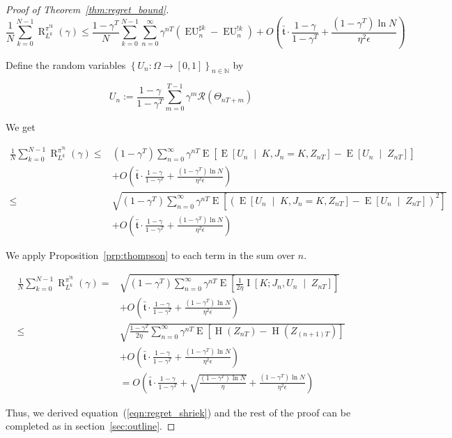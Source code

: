 \documentclass[anon,12pt]{colt2018} %
\newcommand{\Comment}[1]{}
\newcommand{\AP}[1]{\left(#1\right)}
\newcommand{\AB}[1]{\left[#1\right]}
\newcommand{\AC}[1]{\left\{#1\right\}}
\newcommand{\ABM}[2]{\left[#1\;\middle\vert\;#2\right]}
\newcommand{\Ea}[2]{\underset{#1}{\operatorname{E}}\AB{#2}}
\newcommand{\CE}[3]{\underset{#1}{\operatorname{E}}\ABM{#2}{#3}}
\newcommand{\CI}[3]{\underset{#1}{\operatorname{I}}\ABM{#2}{#3}}
\newcommand{\Ena}[1]{\operatorname{H}\AP{#1}}
\newcommand{\Nats}{\mathbb{N}}
\newcommand{\R}{\mathcal{R}}
\newcommand{\EU}{\operatorname{EU}}
\newcommand{\Rg}{\operatorname{R}}
\newcommand{\Tn}{\mathfrak{t}}
\newcommand{\IP}{\pi^{!k}}
\begin{document}
\begin{proof}[Proof of Theorem~\ref{thm:regret_bound}]
\[\frac{1}{N}\sum_{k=0}^{N-1}\Rg_{L^k}^{\IP}(\gamma) \leq \frac{1-\gamma^T}{N}\sum_{k=0}^{N-1}\sum_{n=0}^\infty \gamma^{nT}\AP{\EU^{\sharp k}_n-\EU^{!k}_n}+O\AP{\bar{\Tn}\cdot\frac{1-\gamma}{1-\gamma^T}+\frac{\AP{1-\gamma^T}\ln{N}}{\eta^2\epsilon}}\]

Define the random variables $\AC{U_n : \Omega \rightarrow [0,1]}_{n\in\Nats}$ by 

$$U_n:=\frac{1-\gamma}{1-\gamma^T}\sum_{m=0}^{T-1} \gamma^{m} \R\AP{\Theta_{nT+m}}$$

\Comment{Denote 

$$\beta:=\frac{\AP{1-(1-\alpha)^T}\ln N}{\eta^2\epsilon}+\frac{\bar{\tau}\alpha}{1-(1-\alpha)^T}$$}

We get

\begin{align*}
\frac{1}{N}\sum_{k=0}^{N-1}\Rg_{L^k}^{\IP}(\gamma) \leq &\AP{1-\gamma^T}\sum_{n=0}^\infty \gamma^{nT} \Ea{}{\CE{}{U_n}{K, J_n = K, Z_{nT}}-\CE{}{U_n}{Z_{nT}}} \\ 
&+ O\AP{\bar{\Tn}\cdot\frac{1-\gamma}{1-\gamma^T}+\frac{\AP{1-\gamma^T}\ln{N}}{\eta^2\epsilon}}\\
\leq &\sqrt{\AP{1-\gamma^T}\sum_{n=0}^\infty \gamma^{nT} \Ea{}{\AP{\CE{}{U_n}{K, J_n = K, Z_{nT}}-\CE{}{U_n}{Z_{nT}}}^2}} \\ 
&+ O\AP{\bar{\Tn}\cdot\frac{1-\gamma}{1-\gamma^T}+\frac{\AP{1-\gamma^T}\ln{N}}{\eta^2\epsilon}}
\end{align*}

We apply Proposition~\ref{prp:thompson} to each term in the sum over $n$.

\begin{align*}
\frac{1}{N}\sum_{k=0}^{N-1}\Rg_{L^k}^{\IP}(\gamma) = &\sqrt{\AP{1-\gamma^T}\sum_{n=0}^\infty \gamma^{nT} \Ea{}{\frac{1}{2\eta}\CI{}{K;J_n,U_n}{Z_{nT}}}} \\
&+ O\AP{\bar{\Tn}\cdot\frac{1-\gamma}{1-\gamma^T}+\frac{\AP{1-\gamma^T}\ln{N}}{\eta^2\epsilon}}\\
\leq &\sqrt{\frac{1-\gamma^T}{2\eta}\sum_{n=0}^\infty \gamma^{nT} \Ea{}{\Ena{Z_{nT}}-\Ena{Z_{(n+1)T}}}} \\
&+ O\AP{\bar{\Tn}\cdot\frac{1-\gamma}{1-\gamma^T}+\frac{\AP{1-\gamma^T}\ln{N}}{\eta^2\epsilon}}\\
&=O\AP{\bar{\Tn}\cdot\frac{1-\gamma}{1-\gamma^T}+\sqrt{\frac{\AP{1-\gamma^T}\ln{N}}{\eta}}+\frac{\AP{1-\gamma^T}\ln{N}}{\eta^2\epsilon}}
\end{align*}

Thus, we derived equation~(\ref{eqn:regret_shriek}) and the rest of the proof can be completed as in section~\ref{sec:outline}.
\end{proof}
\end{document}
